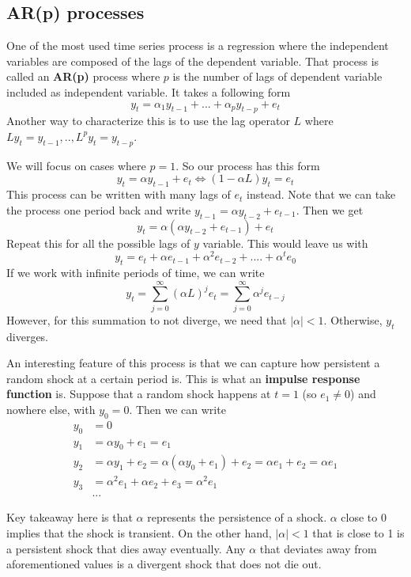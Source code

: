 \documentclass[12pt]{article}
\theoremstyle{definition}
\theoremstyle{property}
\theoremstyle{assumption}
\theoremstyle{example}
\theoremstyle{comment}
\begin{document}
\subsection{AR(p) processes}
One of the most used time series process is a regression where the independent variables are composed of the lags of the dependent variable. That process is called an \textbf{AR(p)} process where $p$ is the number of lags of dependent variable included as independent variable. It takes a following form
\[
y_t = \alpha_1y_{t-1}+...+\alpha_p y_{t-p}+e_t
\]
Another way to characterize this is to use the lag operator $L$ where $Ly_t= y_{t-1},..,L^p y_t = y_{t-p}$. 
\par
We will focus on cases where $p=1$. So our process has this form
\[
y_t = \alpha y_{t-1}+e_t \iff (1-\alpha L)y_t = e_t
\]
This process can be written with many lags of $e_t$ instead. Note that we can take the process one period back and write $y_{t-1}=\alpha y_{t-2}+e_{t-1}$. Then we get
\[
y_{t}=\alpha(\alpha y_{t-2}+e_{t-1})+e_t
\]
Repeat this for all the possible lags of $y$ variable. This would leave us with
\[
y_t = e_t + \alpha e_{t-1} + \alpha^2 e_{t-2}+ .... + \alpha ^t e_0
\] 
If we work with infinite periods of time, we can write
\[
y_t = \sum_{j=0}^\infty (\alpha L)^j e_t= \sum_{j=0}^\infty \alpha^j e_{t-j}
\]
However, for this summation to not diverge, we need that $|\alpha|<1$. Otherwise, $y_t$ diverges.
\par
An interesting feature of this process is that we can capture how persistent a random shock at a certain period is. This is what an \textbf{impulse response function} is. Suppose that a random shock happens at $t=1$ (so $e_1\neq0$) and nowhere else, with $y_0=0$. Then we can write
\[
\begin{aligned}
y_0&=0\\ 
y_1 &=\alpha y_0+ e_1 =e_1\\
y_2 &= \alpha y_1+e_2 = \alpha(\alpha y_0+ e_1)+e_2 = \alpha e_1 + e_2 = \alpha e_1 \\
y_3 & = \alpha^2e_1 + \alpha e_2 + e_3 = \alpha^2 e_1 \\
& ...
\end{aligned}
\]
\par
Key takeaway here is that $\alpha$ represents the persistence of a shock. $\alpha$ close to 0 implies that the shock is transient. On the other hand, $|\alpha|<1$ that is close to 1 is a persistent shock that dies away eventually. Any $\alpha$ that deviates away from aforementioned values is a divergent shock that does not die out. 
\end{document}
